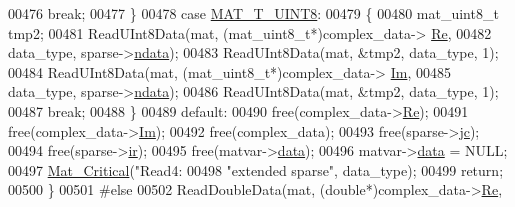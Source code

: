 \begin{DoxyCode}
{00476                                 \textcolor{keywordflow}{break};
00477                             \}
00478                             \textcolor{keywordflow}{case} \hyperlink{group___m_a_t_ggacf7b3b879282b7ab3a51190e49bf3453a01c1bd7db68f90552862eb5d311be408}{MAT\_T\_UINT8}:
00479                             \{
00480                                 mat\_uint8\_t tmp2;
00481                                 ReadUInt8Data(mat, (mat\_uint8\_t*)complex\_data->
      \hyperlink{group___m_a_t_a484a93607508adac2bce53a0252e0325}{Re},
00482                                     data\_type, sparse->\hyperlink{group___m_a_t_a1beb8a8c58a808207cbea650563a9b63}{ndata});
00483                                 ReadUInt8Data(mat, &tmp2, data\_type, 1);
00484                                 ReadUInt8Data(mat, (mat\_uint8\_t*)complex\_data->
      \hyperlink{group___m_a_t_a7182d10b0d3598415887376065440946}{Im},
00485                                     data\_type, sparse->\hyperlink{group___m_a_t_a1beb8a8c58a808207cbea650563a9b63}{ndata});
00486                                 ReadUInt8Data(mat, &tmp2, data\_type, 1);
00487                                 \textcolor{keywordflow}{break};
00488                             \}
00489                             \textcolor{keywordflow}{default}:
00490                                 free(complex\_data->\hyperlink{group___m_a_t_a484a93607508adac2bce53a0252e0325}{Re});
00491                                 free(complex\_data->\hyperlink{group___m_a_t_a7182d10b0d3598415887376065440946}{Im});
00492                                 free(complex\_data);
00493                                 free(sparse->\hyperlink{group___m_a_t_ad1e74cdc4f7eff1e47a670297c01da4b}{jc});
00494                                 free(sparse->\hyperlink{group___m_a_t_a8d4c863d704edddec5cbfa15b2d719c8}{ir});
00495                                 free(matvar->\hyperlink{group___m_a_t_a5672978efa230bbdecdf38ede781f7fa}{data});
00496                                 matvar->\hyperlink{group___m_a_t_a5672978efa230bbdecdf38ede781f7fa}{data} = NULL;
00497                                 \hyperlink{group__mat__util_gaf51f2bfbb5580f575e4dd79757e2b80c}{Mat\_Critical}(\textcolor{stringliteral}{"Read4: %
00498                                     \textcolor{stringliteral}{"extended sparse"}, data\_type);
00499                                 \textcolor{keywordflow}{return};
00500                         \}
00501 \textcolor{preprocessor}{#else}
00502                         ReadDoubleData(mat, (\textcolor{keywordtype}{double}*)complex\_data->\hyperlink{group___m_a_t_a484a93607508adac2bce53a0252e0325}{Re},
}}
\end{DoxyCode}
